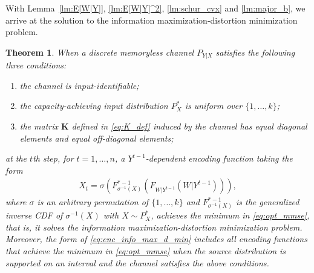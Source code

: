 \documentclass{article}
\newtheorem{theorem}{Theorem}%
\begin{document}
With Lemma~\ref{lm:E[W|Y]}, \ref{lm:E[W|Y]^2}, \ref{lm:schur_cvx} and \ref{lm:major_b}, we arrive at the solution to the information maximization-distortion minimization problem.
\begin{theorem}\label{th:info_max_dist_min}
When a discrete memoryless channel $P_{Y|X}$ satisfies the following three conditions:
\begin{enumerate}
    \item the channel is input-identifiable;
    \item the capacity-achieving input distribution $P_X^*$ is uniform over $\{1,\ldots,k\}$;
    \item the matrix $\boldsymbol{K}$ defined in \eqref{eq:K_def} induced by the channel has equal diagonal elements and equal off-diagonal elements;
\end{enumerate}
at the $t$th step, for $t=1,\ldots,n$, a $Y^{t-1}$-dependent encoding function taking the form
\begin{align}
    X_t = \sigma(F_{\sigma^{-1}(X)}^{*-1}(F_{W|Y^{t-1}}(W|Y^{t-1}))) , \label{eq:enc_info_max_d_min}
\end{align}
where $\sigma$ is an arbitrary permutation of $\{1,\ldots,k\}$ and $F_{\sigma^{-1}(X)}^{*-1}$ is the generalized inverse CDF of $\sigma^{-1}(X)$ with $X\sim P_X^*$, achieves the minimum in \eqref{eq:opt_mmse}, that is, it solves the information maximization-distortion minimization problem. 
Moreover, the form of \eqref{eq:enc_info_max_d_min} includes all encoding functions that achieve the minimum in \eqref{eq:opt_mmse} when the source distribution is supported on an interval and the channel satisfies the above conditions.
\end{theorem}
\end{document}
